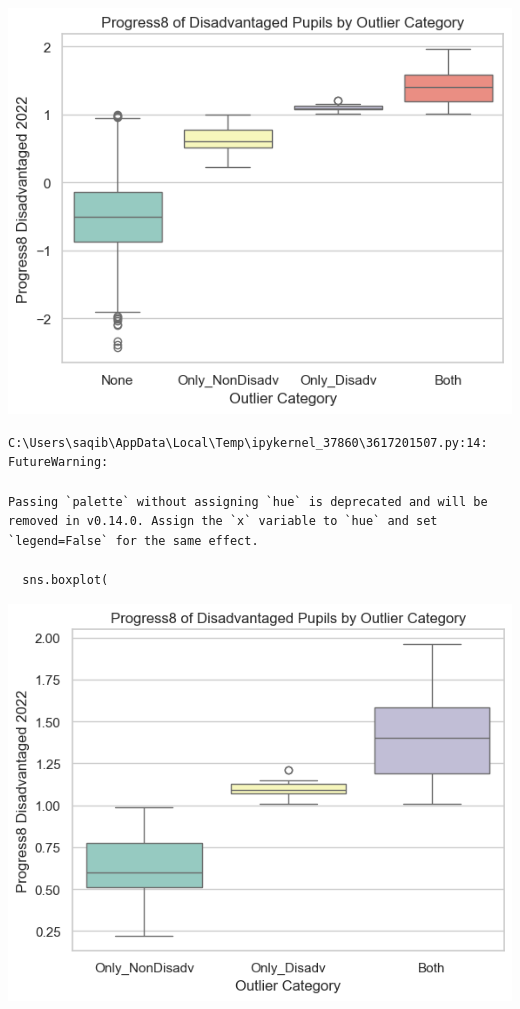 \documentclass[
  letterpaper,
  DIV=11,
  numbers=noendperiod]{scrartcl}
\begin{document}
\includegraphics{P4DS_A2_Data_Analysis_Project_files/figure-pdf/cell-81-output-2.png}

\begin{verbatim}
C:\Users\saqib\AppData\Local\Temp\ipykernel_37860\3617201507.py:14: FutureWarning: 

Passing `palette` without assigning `hue` is deprecated and will be removed in v0.14.0. Assign the `x` variable to `hue` and set `legend=False` for the same effect.

  sns.boxplot(
\end{verbatim}

\includegraphics{P4DS_A2_Data_Analysis_Project_files/figure-pdf/cell-81-output-4.png}
\end{document}
